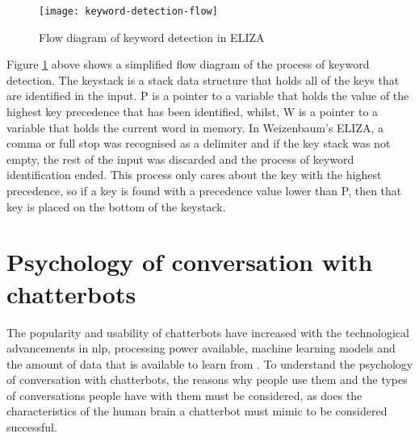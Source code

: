 \begin{figure}[H]
	\centering
	\texttt{[image: keyword-detection-flow]}
	
	\caption{Flow diagram of keyword detection in ELIZA \autocite{weizenbaum-eliza1966}}
	\label{fig:keyword-detection-flow-diagram}
\end{figure} 
\noindent
Figure \ref{fig:keyword-detection-flow-diagram} above shows a simplified flow diagram of the process of keyword detection. The keystack is a stack data structure that holds all of the keys that are identified in the input. P is a pointer to a variable that holds the value of the highest key precedence that has been identified, whilst, W is a pointer to a variable that holds the current word in memory. In Weizenbaum's ELIZA, a comma or full stop was recognised as a delimiter and if the key stack was not empty, the rest of the input was discarded and the process of keyword identification ended. This process only cares about the key with the highest precedence, so if a key is found with a precedence value lower than P, then that key is placed on the bottom of the keystack.

\section{Psychology of conversation with chatterbots}
The popularity and usability of chatterbots have increased with the technological advancements in \gls{nlp}, processing power available, machine learning models and the amount of data that is available to learn from \autocite{deloitte-chatbots2018}. To understand the psychology of conversation with chatterbots, the reasons why people use them and the types of conversations people have with them must be considered, as does the characteristics of the human brain a chatterbot must mimic to be considered successful.
